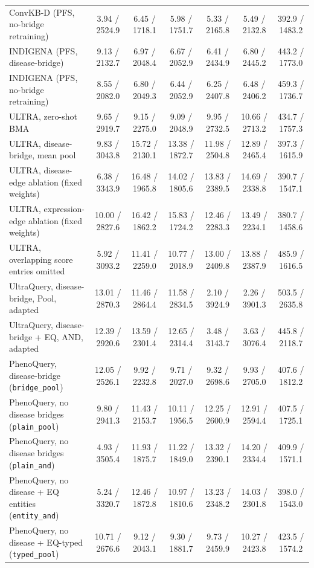 \begin{landscape}
\begin{table}[p]
\begin{tabular}{lcccccc}
ConvKB-D (PFS, no-bridge retraining) & 3.94 / 2524.9 & 6.45 / 1718.1 & 5.98 / 1751.7 & 5.33 / 2165.8 & 5.49 / 2132.8 & 392.9 / 1483.2 \\
INDIGENA (PFS, disease-bridge) & 9.13 / 2132.7 & 6.97 / 2048.4 & 6.67 / 2052.9 & 6.41 / 2434.9 & 6.80 / 2445.2 & 443.2 / 1773.0 \\
INDIGENA (PFS, no-bridge retraining) & 8.55 / 2082.0 & 6.80 / 2049.3 & 6.44 / 2052.9 & 6.25 / 2407.8 & 6.48 / 2406.2 & 459.3 / 1736.7 \\
ULTRA, zero-shot BMA & 9.65 / 2919.7 & 9.15 / 2275.0 & 9.09 / 2048.9 & 9.95 / 2732.5 & 10.66 / 2713.2 & 434.7 / 1757.3 \\
ULTRA, disease-bridge, mean pool & 9.83 / 3043.8 & 15.72 / 2130.1 & 13.38 / 1872.7 & 11.98 / 2504.8 & 12.89 / 2465.4 & 397.3 / 1615.9 \\
ULTRA, disease-edge ablation (fixed weights) & 6.38 / 3343.9 & 16.48 / 1965.8 & 14.02 / 1805.6 & 13.83 / 2389.5 & 14.69 / 2338.8 & 390.7 / 1547.1 \\
ULTRA, expression-edge ablation (fixed weights) & 10.00 / 2827.6 & 16.42 / 1862.2 & 15.83 / 1724.2 & 12.46 / 2283.3 & 13.49 / 2234.1 & 380.7 / 1458.6 \\
ULTRA, overlapping score entries omitted & 5.92 / 3093.2 & 11.41 / 2259.0 & 10.77 / 2018.9 & 13.00 / 2409.8 & 13.88 / 2387.9 & 485.9 / 1616.5 \\
UltraQuery, disease-bridge, Pool, adapted & 13.01 / 2870.3 & 11.46 / 2864.4 & 11.58 / 2834.5 & 2.10 / 3924.9 & 2.26 / 3901.3 & 503.5 / 2635.8 \\
UltraQuery, disease-bridge + EQ, AND, adapted & 12.39 / 2920.6 & 13.59 / 2301.4 & 12.65 / 2314.4 & 3.48 / 3143.7 & 3.63 / 3076.4 & 445.8 / 2118.7 \\
PhenoQuery, disease-bridge (\texttt{bridge\_pool}) & 12.05 / 2526.1 & 9.92 / 2232.8 & 9.71 / 2027.0 & 9.32 / 2698.6 & 9.93 / 2705.0 & 407.6 / 1812.2 \\
PhenoQuery, no disease bridges (\texttt{plain\_pool}) & 9.80 / 2941.3 & 11.43 / 2153.7 & 10.11 / 1956.5 & 12.25 / 2600.9 & 12.91 / 2594.4 & 407.5 / 1725.1 \\
PhenoQuery, no disease bridges (\texttt{plain\_and}) & 4.93 / 3505.4 & 11.93 / 1875.7 & 11.22 / 1849.0 & 13.32 / 2390.1 & 14.20 / 2334.4 & 409.9 / 1571.1 \\
PhenoQuery, no disease + EQ entities (\texttt{entity\_and}) & 5.24 / 3320.7 & 12.46 / 1872.8 & 10.97 / 1810.6 & 13.23 / 2348.2 & 14.03 / 2301.8 & 398.0 / 1543.0 \\
PhenoQuery, no disease + EQ-typed (\texttt{typed\_pool}) & 10.71 / 2676.6 & 9.12 / 2043.1 & 9.30 / 1881.7 & 9.73 / 2459.9 & 10.27 / 2423.8 & 423.5 / 1574.2 \\

\end{tabular}
\end{table}
\end{landscape}
